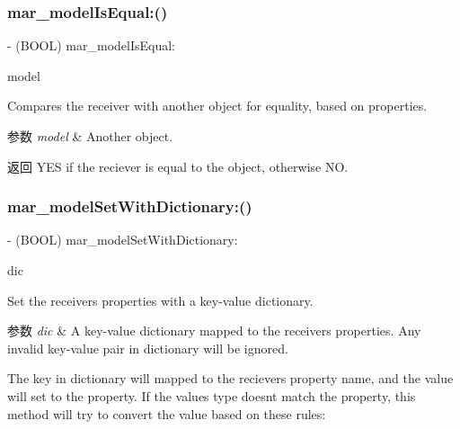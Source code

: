 \subsubsection{\texorpdfstring{mar\+\_\+model\+Is\+Equal\+:()}{mar\_modelIsEqual:()}}
{\footnotesize\ttfamily -\/ (B\+O\+OL) mar\+\_\+model\+Is\+Equal\+: \begin{DoxyParamCaption}\item[{(id)}]{model }\end{DoxyParamCaption}}

Compares the receiver with another object for equality, based on properties.


\begin{DoxyParams}{参数}
{\em model} & Another object.\\
\hline
\end{DoxyParams}
\begin{DoxyReturn}{返回}
{\ttfamily Y\+ES} if the reciever is equal to the object, otherwise {\ttfamily NO}. 
\end{DoxyReturn}
\mbox{\label{category_n_s_object_07_m_a_r_model_08_ab4b927a12df81c4900b640ef2e3284b5}} 
\subsubsection{\texorpdfstring{mar\+\_\+model\+Set\+With\+Dictionary\+:()}{mar\_modelSetWithDictionary:()}}
{\footnotesize\ttfamily -\/ (B\+O\+OL) mar\+\_\+model\+Set\+With\+Dictionary\+: \begin{DoxyParamCaption}\item[{(N\+S\+Dictionary $\ast$)}]{dic }\end{DoxyParamCaption}}

Set the receiver\textquotesingle{}s properties with a key-\/value dictionary.


\begin{DoxyParams}{参数}
{\em dic} & A key-\/value dictionary mapped to the receiver\textquotesingle{}s properties. Any invalid key-\/value pair in dictionary will be ignored.\\
\hline
\end{DoxyParams}
The key in {\ttfamily dictionary} will mapped to the reciever\textquotesingle{}s property name, and the value will set to the property. If the value\textquotesingle{}s type doesn\textquotesingle{}t match the property, this method will try to convert the value based on these rules\+:

